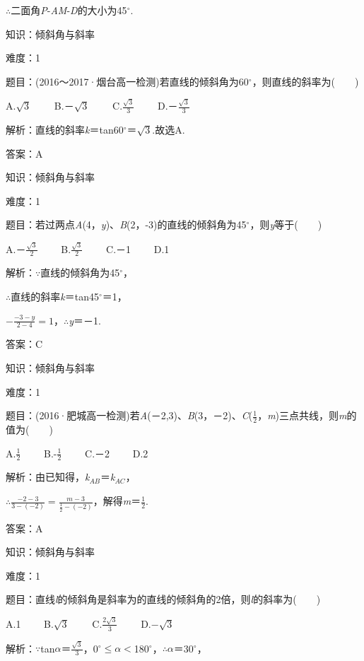 \documentclass{article} %
\begin{document}
$\mathrm{\therefore}$二面角\textit{P}-\textit{AM}-\textit{D}的大小为45$\mathrm{{}^\circ}$. 


知识：倾斜角与斜率

难度：1

题目：(2016～2017·烟台高一检测)若直线的倾斜角为60$\mathrm{{}^\circ}$，则直线的斜率为(　　)

A.$\sqrt{3}$　　 B.－$\sqrt{3}$　　 C.$\frac{\sqrt{3}}{3}$　　 D.－$\frac{\sqrt{3}}{3}$

解析：直线的斜率\textit{k}＝tan60$\mathrm{{}^\circ}$＝$\sqrt{3}$.故选A.

答案：A

知识：倾斜角与斜率

难度：1

题目：若过两点\textit{A}(4，\textit{y})、\textit{B}(2，-3)的直线的倾斜角为45$\mathrm{{}^\circ}$，则\textit{y}等于(　　)

A.－$\frac{\sqrt{3}}{2}$　　 B.$\frac{\sqrt{3}}{2}$　　 C.－1　　 D.1

解析：$\mathrm{\because}$直线的倾斜角为45$\mathrm{{}^\circ}$，

$\mathrm{\therefore}$直线的斜率\textit{k}＝tan45$\mathrm{{}^\circ}$＝1，

$-\frac{-3-y}{2-4}=1$，$\mathrm{\therefore}$\textit{y}＝－1.

答案：C

知识：倾斜角与斜率

难度：1

题目：(2016·肥城高一检测)若\textit{A}(－2,3)、\textit{B}(3，－2)、\textit{C}($\frac{1}{2}$，\textit{m})三点共线，则\textit{m}的值为(　　)

A.$\frac{1}{2}$　　 B.-$\frac{1}{2}$　　 C.－2　　 D.2

解析：由已知得，\textit{k${}_{AB}$}＝\textit{k${}_{AC}$}，

$\mathrm{\therefore}\frac{-2-3}{3-(-2)}=\frac{m-3}{\frac{1}{2}-(-2)}$，解得\textit{m}＝$\frac{1}{2}$.

答案：A

知识：倾斜角与斜率

难度：1

题目：直线\textit{l}的倾斜角是斜率为的直线的倾斜角的2倍，则\textit{l}的斜率为(　　)

A.1　　 B.$\sqrt{3}$　　 C.$\frac{2\sqrt{3}}{3}$　　 D.$-\sqrt{3}$

解析：$\mathrm{\because}$tan\textit{$\alpha$}＝$\frac{\sqrt{3}}{3}$，0$\mathrm{{}^\circ}$$\mathrm{\le}$\textit{$\alpha$}$\mathrm{<}$180$\mathrm{{}^\circ}$，$\mathrm{\therefore}$\textit{$\alpha$}＝30$\mathrm{{}^\circ}$，
\end{document}
